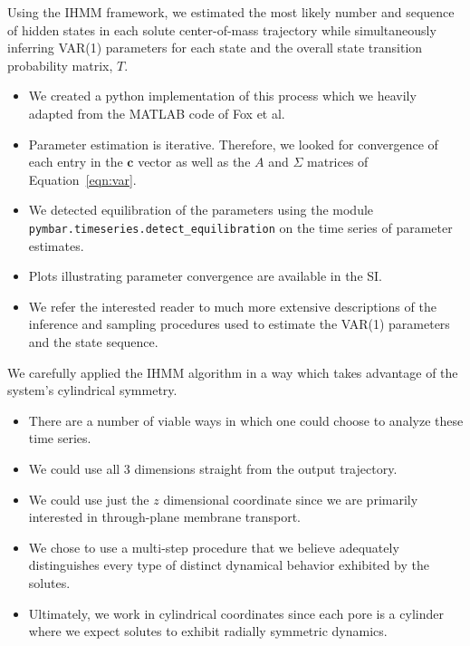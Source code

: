 \documentclass{article}
\begin{document}
  Using the IHMM framework, we estimated the most likely number and sequence of hidden
  states in each solute center-of-mass trajectory while simultaneously inferring VAR(1)
  parameters for each state and the overall state transition probability matrix, $T$.
  \begin{itemize}
    \item We created a python implementation of this process which we heavily adapted from
    the MATLAB code of Fox et al.~\cite{fox_sticky_2007} 
    \item Parameter estimation is iterative. Therefore, we looked for convergence 
    of each entry in the $\mathbf{c}$ vector as well as the $A$ and $\Sigma$ matrices of 
    Equation~\ref{eqn:var}.
    \item We detected equilibration of the parameters using the module 
    \texttt{pymbar.timeseries.detect\_equilibration} on the time series of 
    parameter estimates. 
    \item Plots illustrating parameter convergence are available in the SI.
    \item We refer the interested reader to much more extensive descriptions of 
    the inference and sampling procedures used to estimate the VAR(1) parameters
    and the state sequence. 
    ~\cite{beal_infinite_2002,teh_hierarchical_2006,van_gael_beam_2008,fox_nonparametric_2009,fox_bayesian_2010}
  \end{itemize}

  We carefully applied the IHMM algorithm in a way which takes advantage of the
  system's cylindrical symmetry.
  \begin{itemize}
    \item There are a number of viable ways in which one could choose to analyze 
    these time series.
    \item We could use all 3 dimensions straight from the output trajectory.
    \item We could use just the $z$ dimensional coordinate since we are primarily
    interested in through-plane membrane transport.
    \item We chose to use a multi-step procedure that we believe adequately
    distinguishes every type of distinct dynamical behavior exhibited by 
    the solutes.
    \item Ultimately, we work in cylindrical coordinates since each pore is a 
    cylinder where we expect solutes to exhibit radially symmetric dynamics.
  \end{itemize}  
  
\end{document}
